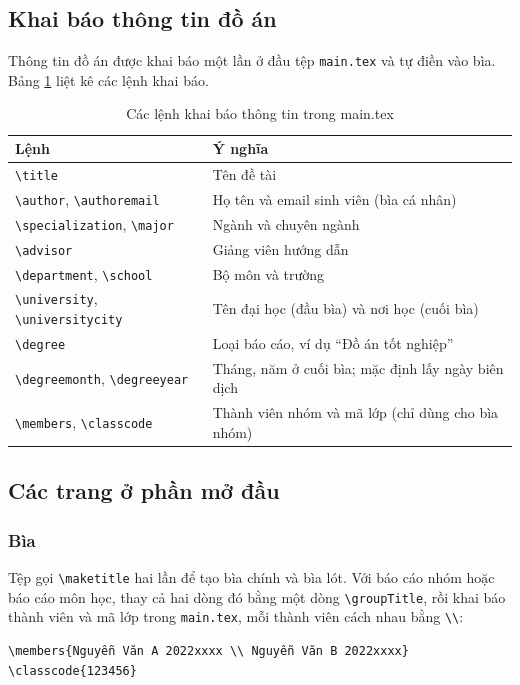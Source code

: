 \subsection{Khai báo thông tin đồ án}
Thông tin đồ án được khai báo một lần ở đầu tệp \texttt{main.tex} và tự điền vào bìa. Bảng \ref{bang:thongtin} liệt kê các lệnh khai báo.
\begin{table}[H]
    \centering
    \caption{Các lệnh khai báo thông tin trong main.tex}
    \label{bang:thongtin}
    \begin{tabularx}{\textwidth}{|l|X|}
        \hline
        \bfseries Lệnh & \bfseries Ý nghĩa \\ \hline
        \texttt{\textbackslash title} & Tên đề tài \\ \hline
        \texttt{\textbackslash author}, \texttt{\textbackslash authoremail} & Họ tên và email sinh viên (bìa cá nhân) \\ \hline
        \texttt{\textbackslash specialization}, \texttt{\textbackslash major} & Ngành và chuyên ngành \\ \hline
        \texttt{\textbackslash advisor} & Giảng viên hướng dẫn \\ \hline
        \texttt{\textbackslash department}, \texttt{\textbackslash school} & Bộ môn và trường \\ \hline
        \texttt{\textbackslash university}, \texttt{\textbackslash universitycity} & Tên đại học (đầu bìa) và nơi học (cuối bìa) \\ \hline
        \texttt{\textbackslash degree} & Loại báo cáo, ví dụ ``Đồ án tốt nghiệp'' \\ \hline
        \texttt{\textbackslash degreemonth}, \texttt{\textbackslash degreeyear} & Tháng, năm ở cuối bìa; mặc định lấy ngày biên dịch \\ \hline
        \texttt{\textbackslash members}, \texttt{\textbackslash classcode} & Thành viên nhóm và mã lớp (chỉ dùng cho bìa nhóm) \\ \hline
    \end{tabularx}
\end{table}

\subsection{Các trang ở phần mở đầu}
\subsubsection{Bìa}
Tệp  gọi \verb|\maketitle| hai lần để tạo bìa chính và bìa lót. Với báo cáo nhóm hoặc báo cáo môn học, thay cả hai dòng đó bằng một dòng \verb|\groupTitle|, rồi khai báo thành viên và mã lớp trong \texttt{main.tex}, mỗi thành viên cách nhau bằng \verb|\\|:
\begin{verbatim}
\members{Nguyễn Văn A 2022xxxx \\ Nguyễn Văn B 2022xxxx}
\classcode{123456}
\end{verbatim}

